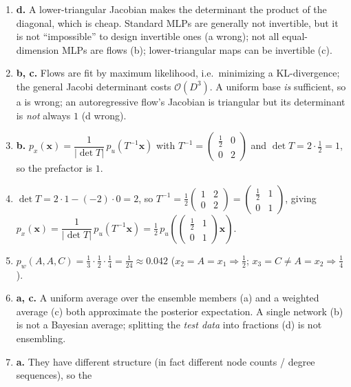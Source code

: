 \documentclass[11pt,oneside]{article}
\begin{document}
\begin{enumerate}[label=\textbf{Q\arabic*.}, leftmargin=3em, itemsep=4pt]
        mode collapse via the covariance) and is in fact the closed-form Wasserstein-2 distance between two
        Gaussians; IS and FID assess GAN image quality. They use Inception features, not AlexNet (c wrong),
        and are not training objectives (d wrong).
  \item \textbf{d.} A lower-triangular Jacobian makes the determinant the product of the diagonal, which is
        cheap. Standard MLPs are generally not invertible, but it is not ``impossible'' to design invertible
        ones (a wrong); not all equal-dimension MLPs are flows (b); lower-triangular maps can be invertible (c).
  \item \textbf{b, c.} Flows are fit by maximum likelihood, i.e.\ minimizing a KL-divergence; the general
        Jacobi determinant costs $\mathcal{O}(D^3)$. A uniform base \emph{is} sufficient, so a is wrong;
        an autoregressive flow's Jacobian is triangular but its determinant is \emph{not} always $1$ (d wrong).
  \item \textbf{b.} $p_x(\mathbf{x})=\dfrac{1}{|\det T|}\,p_u(T^{-1}\mathbf{x})$ with
        $T^{-1}=\begin{pmatrix}\tfrac12&0\\0&2\end{pmatrix}$ and $\det T=2\cdot\tfrac12=1$, so the prefactor is $1$.
  \item $\det T=2\cdot1-(-2)\cdot0=2$, so $T^{-1}=\tfrac12\begin{pmatrix}1&2\\0&2\end{pmatrix}=\begin{pmatrix}\tfrac12&1\\0&1\end{pmatrix}$, giving
        $p_x(\mathbf{x})=\dfrac{1}{|\det T|}\,p_u(T^{-1}\mathbf{x})=\tfrac12\,p_u\!\left(\begin{pmatrix}\tfrac12&1\\0&1\end{pmatrix}\mathbf{x}\right)$.
  \item $p_w(A,A,C)=\tfrac13\cdot\tfrac12\cdot\tfrac14=\tfrac{1}{24}\approx\mathbf{0.042}$
        ($x_2=A=x_1\Rightarrow\tfrac12$; $x_3=C\neq A=x_2\Rightarrow\tfrac14$).
  \item \textbf{a, c.} A uniform average over the ensemble members (a) and a weighted average (c) both
        approximate the posterior expectation. A single network (b) is not a Bayesian average; splitting the
        \emph{test data} into fractions (d) is not ensembling.
  \item \textbf{a.} They have different structure (in fact different node counts / degree sequences), so the

\end{enumerate}
\end{document}
